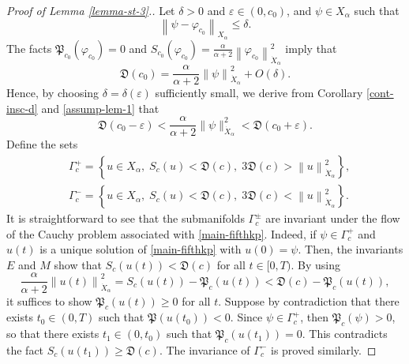 \documentclass[10pt]{article}
\newcommand{\sett}[1]{\left\{   #1   \right\}}
\newcommand{\norm}[1]{\left\|   #1   \right\|}
\newcommand{\fd}{\mathfrak{D}}
\newcommand{\fp}{\mathfrak{P}}
\numberwithin{equation}{section}
\newcommand{\ff}{\varphi}
\newcommand{\al}{\alpha}
\begin{document}
	\begin{proof}[Proof of Lemma \ref{lemma-st-3}.]
		Let $\delta>0$ and $\varepsilon\in(0,c_0)$, and $\psi\in X_\al$ such that
		\[
		\norm{\psi-\ff_{c_0}}_{X_\al}\leq\delta.
		\]
		The facts $\fp_{c_0}(\ff_{c_0})=0$ and $S_{c_0}(\ff_{c_0})=\frac\al{\al+2}\norm{\ff_{c_0}}_{\dot{X}_\al}^2$ imply that
		\begin{equation}
			\fd(c_0)=
			\frac\al{\al+2}\norm{\psi}_{\dot{X}_\al}^2+O(\delta).
		\end{equation}
		Hence, by choosing $\delta=\delta(\varepsilon)$ sufficiently small, we derive from Corollary \ref{cont-insc-d} and \eqref{assump-lem-1} that
		\begin{equation} \label{claim-lem-1-0}
			\fd(c_0-\varepsilon)<\frac\al{\al+2}\|\psi\|_{\dot{X}_\al}^2<\fd(c_0+\varepsilon).
		\end{equation}
		Define the sets
		\begin{equation}
			\begin{split}
				&\Gamma_c^+=\sett{u\in X_\al,\;S_c(u)<\fd(c),\; 3\fd(c)>\norm{u}_{\dot{X}_\al}^2 },\\
				&\Gamma_c^-=\sett{u\in X_\al,\;S_c(u)<\fd(c),\; 3\fd(c)<\norm{u}_{\dot{X}_\al}^2 }.
			\end{split}
		\end{equation}
		It is straightforward to see that the submanifolds $\Gamma_c^\pm$ are invariant under the flow of the Cauchy problem associated with \ref{main-fifthkp}. Indeed, if $\psi\in \Gamma_c^+$ and $u(t)$ is a unique solution of \eqref{main-fifthkp} with $u(0)=\psi$. Then, the invariants $E$ and $M$ show that $S_c(u(t))<\fd(c)$ for all $t\in[0,T)$. By using
		\[
		\frac\al{\al+2}\norm{u(t)}_{\dot{X}_\al}^2=S_c(u(t))-\fp_c(u(t))<\fd(c)-\fp_c(u(t)),
		\]
		it suffices to show $\fp_c(u(t))\geq0$ for all $t$. Suppose by contradiction that there exists $t_0\in(0,T)$ such that $\fp(u(t_0))<0$. Since $\psi\in\Gamma_c^+$, then $\fp_c(\psi)>0$, so that there exists $t_1\in(0,t_0)$ such that $\fp_c(u(t_1))=0$. This contradicts the fact $S_c(u(t_1))\geq\fd(c)$. The invariance of $\Gamma_c^-$ is proved similarly.
		

\end{proof}
\end{document}
